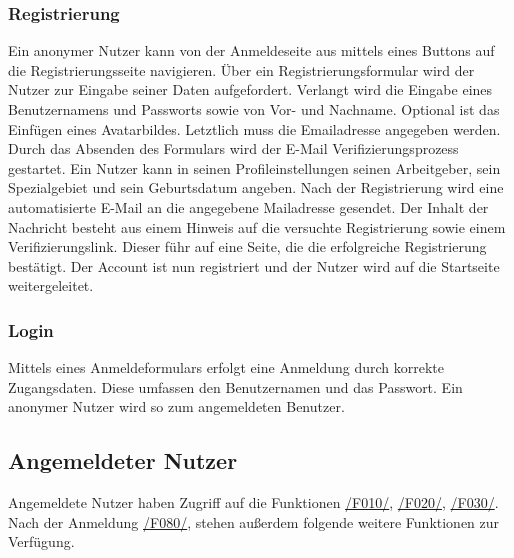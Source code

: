 \subsubsection{Registrierung}
\begin{description}
     Ein anonymer Nutzer kann von der Anmeldeseite aus mittels eines
    Buttons auf die Registrierungsseite navigieren.
     Über ein Registrierungsformular wird der Nutzer zur Eingabe seiner
    Daten aufgefordert. Verlangt wird die Eingabe eines Benutzernamens und Passworts
    sowie von Vor- und Nachname. Optional ist das Einfügen eines Avatarbildes. 
    Letztlich muss die Emailadresse
    angegeben werden. Durch das Absenden des Formulars wird der E-Mail Verifizierungsprozess
    gestartet.
     Ein Nutzer kann in seinen Profileinstellungen seinen Arbeitgeber, sein Spezialgebiet und sein Geburtsdatum angeben.
     Nach der Registrierung wird eine automatisierte E-Mail
    an die angegebene Mailadresse gesendet. Der Inhalt der Nachricht besteht aus einem Hinweis auf
    die versuchte Registrierung sowie einem Verifizierungslink. Dieser führ auf eine Seite, die
    die erfolgreiche Registrierung bestätigt. Der Account ist nun registriert und der Nutzer wird auf die Startseite
    weitergeleitet.
\end{description}

\subsubsection{Login}
\begin{description}
     Mittels eines Anmeldeformulars erfolgt eine Anmeldung durch korrekte Zugangsdaten.
    Diese umfassen den Benutzernamen und das Passwort. Ein anonymer Nutzer wird so zum angemeldeten Benutzer.
\end{description}

\subsection{Angemeldeter Nutzer}
Angemeldete Nutzer haben Zugriff auf die Funktionen
\hyperref[funkt:010]{/F010/}, \hyperref[funkt:020]{/F020/}, \hyperref[funkt:030]{/F030/}.
Nach der Anmeldung \hyperref[funkt:080]{/F080/},
stehen außerdem folgende weitere Funktionen zur Verfügung.


